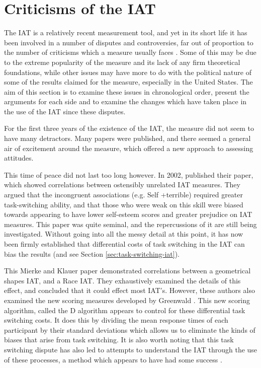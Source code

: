 \section{Criticisms of the IAT}
\label{sec:crit-contr-iat}

The IAT is a relatively recent measurement tool, and yet in its short life it has been involved in a number of disputes and controversies, far out of proportion to the number of criticisms which a measure usually faces \cite{VonHippel2004}. Some of this may be due to the  extreme popularity of the measure and its lack of any firm theoretical foundations, while other issues may have more to do with the political nature of some of the results claimed for the measure, especially in the United States.  The aim of this section is to examine these issues in chronological order, present the arguments for each side and to examine the changes which have taken place in the use of the IAT since these disputes. 

For the first three years of the existence of the IAT, the measure did not seem to have many detractors. Many papers were published, and there seemed a general air of excitement around the measure, which offered a new approach to assessing attitudes. 

This time of peace did not last too long however. In 2002, \cite{McFarland2002} published their paper, which showed correlations between ostensibly unrelated IAT measures. They argued that the incongruent associations (e.g. Self +terrible) required greater task-switching ability, and that those who were weak on this skill were biased towards appearing to have lower self-esteem scores and greater prejudice on IAT measures. This paper was quite seminal, and the repercussions of it are still being investigated. Without going into all the messy detail at this point, it has now been firmly established that differential costs of task switching in the IAT can bias the results \cite{Mierke2001,Mierke2003} (and see Section \ref{sec:task-switching-iat}). 

This Mierke and Klauer paper demonstrated correlations between a geometrical shapes IAT, and a Race IAT. They exhaustively examined the details of this effect, and concluded that it could effect most IAT's. However, these authors also examined the new scoring measures developed by Greenwald \cite{Greenwald2003a}. This new scoring algorithm, called the D algorithm appears to control for these differential task switching costs. It does this by dividing the mean response times of each participant by their standard deviations which allows us to eliminate the kinds of biases that arise from task switching. It is also worth noting that this task switching dispute has also led to attempts to understand the IAT through the use of these processes, a method which appears to have had some success \cite{Klauer2005}. 

